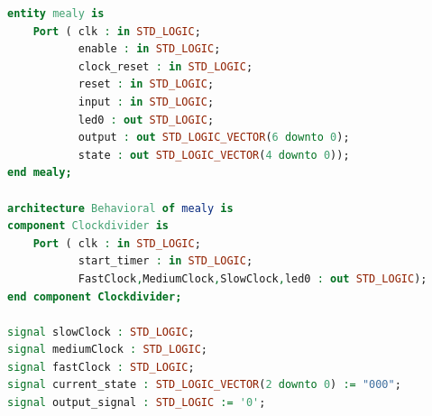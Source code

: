 \documentclass[11pt]{article}
\begin{document}
\begin{appendices}
\begin{lstlisting}[language=VHDL]
entity mealy is
    Port ( clk : in STD_LOGIC;
           enable : in STD_LOGIC;
           clock_reset : in STD_LOGIC;
           reset : in STD_LOGIC;
           input : in STD_LOGIC;
           led0 : out STD_LOGIC;
           output : out STD_LOGIC_VECTOR(6 downto 0);
           state : out STD_LOGIC_VECTOR(4 downto 0));
end mealy;

architecture Behavioral of mealy is
component Clockdivider is
    Port ( clk : in STD_LOGIC;
           start_timer : in STD_LOGIC;
           FastClock,MediumClock,SlowClock,led0 : out STD_LOGIC);
end component Clockdivider;

signal slowClock : STD_LOGIC;
signal mediumClock : STD_LOGIC;
signal fastClock : STD_LOGIC;
signal current_state : STD_LOGIC_VECTOR(2 downto 0) := "000";
signal output_signal : STD_LOGIC := '0'; 


\end{lstlisting}
\end{appendices}
\end{document}
